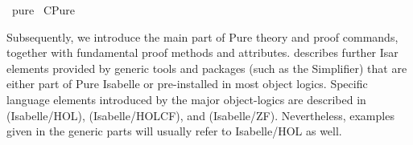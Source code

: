 %
\begin{isabellebody}%
\def\isabellecontext{pure}%
%
\isadelimtheory
\isanewline
\isanewline
%
\endisadelimtheory
%
\isatagtheory
{}\isamarkupfalse%
\ pure\isanewline
{}\ CPure\isanewline
{}%
\endisatagtheory
{\isafoldtheory}%
%
\isadelimtheory
%
\endisadelimtheory
%
\isamarkuptrue%
%
\begin{isamarkuptext}%
Subsequently, we introduce the main part of Pure theory and proof
  commands, together with fundamental proof methods and attributes.
   describes further Isar elements provided by
  generic tools and packages (such as the Simplifier) that are either
  part of Pure Isabelle or pre-installed in most object logics.
  Specific language elements introduced by the major object-logics are
  described in  (Isabelle/HOL), 
  (Isabelle/HOLCF), and  (Isabelle/ZF).  Nevertheless,
  examples given in the generic parts will usually refer to
  Isabelle/HOL as well.


\end{isamarkuptext}
\end{isabellebody}
